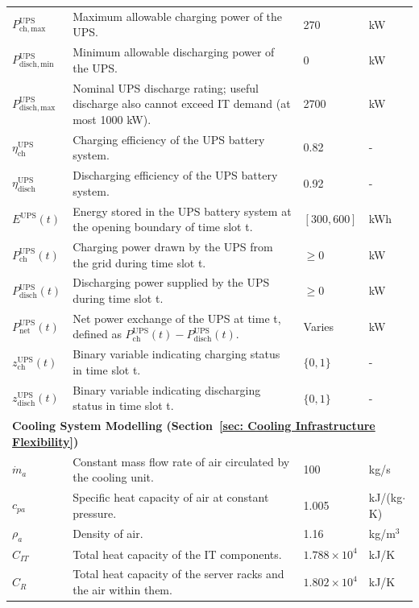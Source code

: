 \documentclass[lettersize,journal]{IEEEtran}
\begin{document}
{{\begin{longtable}{p{} p{} p{} p{}}
$P^{\mathrm{UPS}}_{\mathrm{ch,max}}$ & Maximum allowable charging power of the UPS. & 270 &kW \\
$P^{\mathrm{UPS}}_{\mathrm{disch,min}}$ & Minimum allowable discharging power of the UPS. & 0 &kW \\
$P^{\mathrm{UPS}}_{\mathrm{disch,max}}$ & Nominal UPS discharge rating; useful discharge also cannot exceed IT demand (at most 1000 kW). & 2700 &kW \\
$\eta^{\mathrm{UPS}}_{\mathrm{ch}}$ & Charging efficiency of the UPS battery system. & 0.82 & - \\
$\eta^{\mathrm{UPS}}_{\mathrm{disch}}$ & Discharging efficiency of the UPS battery system. & 0.92 & - \\
$E^{\mathrm{UPS}}(t)$ & Energy stored in the UPS battery system at the opening boundary of time slot t. & $[300, 600]$ &kWh \\
$P^{\mathrm{UPS}}_{\mathrm{ch}}(t)$ & Charging power drawn by the UPS from the grid during time slot t. & $\geq 0$ &kW \\
$P^{\mathrm{UPS}}_{\mathrm{disch}}(t)$ & Discharging power supplied by the UPS during time slot t. & $\geq 0$ &kW \\
$P^{\mathrm{UPS}}_{\mathrm{net}}(t)$ & Net power exchange of the UPS at time t, defined as $P^{\mathrm{UPS}}_{\mathrm{ch}}(t) - P^{\mathrm{UPS}}_{\mathrm{disch}}(t)$. & Varies &kW \\
$z^{\mathrm{UPS}}_{\mathrm{ch}}(t)$ & Binary variable indicating charging status in time slot t. & $\{0, 1\}$ & - \\
$z^{\mathrm{UPS}}_{\mathrm{disch}}(t)$ & Binary variable indicating discharging status in time slot t. & $\{0, 1\}$ & - \\
\midrule
\multicolumn{4}{l}{\textbf{Cooling System Modelling (Section~\ref{sec: Cooling Infrastructure Flexibility})}} \\
\midrule
$\dot{m}_a$ & Constant mass flow rate of air circulated by the cooling unit. & 100 & kg/s \\
$c_{pa}$ & Specific heat capacity of air at constant pressure. & 1.005 & kJ/(kg$\cdot$K) \\
$\rho_a$ & Density of air. & 1.16 & kg/m$^3$ \\
$C_{IT}$ & Total heat capacity of the IT components. & $1.788 \times 10^4$ & kJ/K \\
$C_R$ & Total heat capacity of the server racks and the air within them. & $1.802 \times 10^4$ & kJ/K \\

\end{longtable}}}
\end{document}
